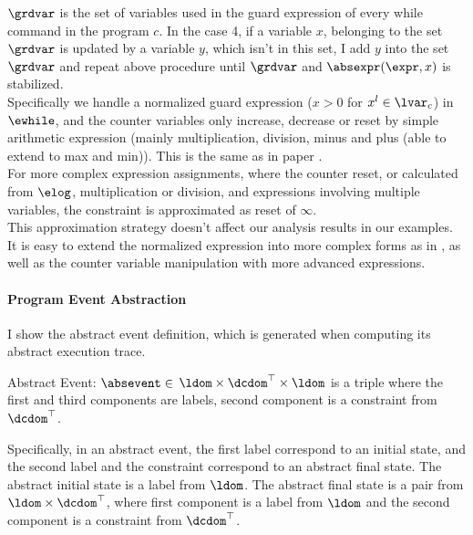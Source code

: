     $\grdvar$ is the set of variables used in the guard expression of every while command in the program $c$. 
  In the case 4, if a variable $x$, belonging to the set 
  $\grdvar$ is updated by a variable $y$, which isn't in this set, 
  I add $y$ into the set $\grdvar$ and repeat 
  above procedure  until $\grdvar$ and $\absexpr(\expr, x)$ is stabilized. 
  \\
Specifically 
we handle a 
normalized guard expression ($ x > 0$ for $x^l \in \lvar_c$)
 in $\ewhile$, and 
the counter variables only increase, decrease or reset by 
simple arithmetic expression (mainly multiplication, division, minus and plus (able to extend to max and min)). 
This is the same as in paper \cite{SinnZV17}. 
\\
For more complex expression assignments, where the counter reset, or calculated from $\elog$, 
multiplication or division, and expressions involving multiple variables, the constraint is approximated as reset of $\infty$.
\\
This approximation strategy
doesn't affect our analysis results in our examples. It is easy to extend the normalized expression 
into more complex forms as in \cite{SinnZV17}, as well as the 
counter variable manipulation with more advanced expressions.


\paragraph{Program Event Abstraction}
 I show the abstract event definition, which is generated when computing its abstract execution trace.

\begin{defn}
  \label{def:abs_event}
  Abstract Event: 
  $\absevent \in $
  $\ldom \times \dcdom^{\top} \times \ldom$
  is a 
  triple where the first and third components are labels,
  second component is a constraint from $\dcdom^{\top}$.
  \end{defn}
  Specifically, in an abstract event, 
  the first label correspond to an initial state, and 
  the second label and the constraint correspond to an abstract final state.
 The abstract initial state is a label from $\ldom$.
The abstract final state is a pair from $\ldom \times \dcdom^{\top}$,  
where first component is a label from $\ldom$ and the second component is a constraint from $\dcdom^{\top}$.
%

